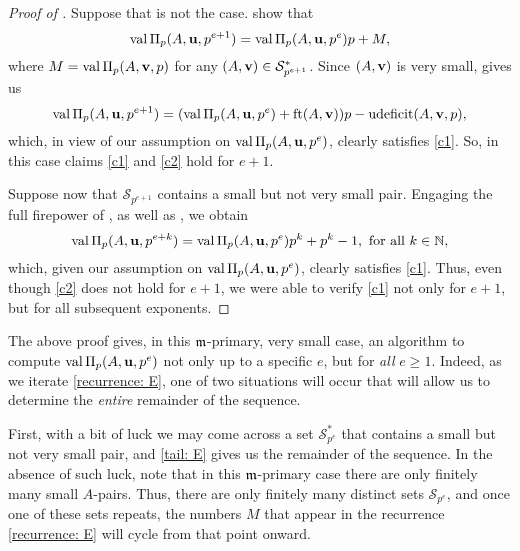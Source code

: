 \documentclass[11pt]{amsart}
\newcommand{\udeficit}{\operatorname{udeficit}}
\renewcommand{\S}{\mathcal{S}}
\begin{document}
\begin{proof}[Proof of ]
   Suppose that is not the case.
    show that
   \begin{equation}
      \label{recurrence: E}
      \operatorname{val} \Pi_p(A,\mathbf{u},p^{e+1}) = \operatorname{val} \Pi_p(A,\mathbf{u},p^e)p + M,
   \end{equation}
   where $M = \operatorname{val}\Pi_p(A,\mathbf{v},p)$ for any  $(A,\vv{v}) \in \S^*_{p^{e+1}}$.
   Since $(A,\mathbf{v})$ is very small,  gives us
   \[\val \IP_p(A,\vv{u},p^{e+1}) = (\val \IP_p(A,\vv{u},p^e) + \ft{A}{\vv{v}}) p - \udeficit(A,\vv{v},p),\]
   which, in view of our assumption on $\operatorname{val} \Pi_p(A,\mathbf{u},p^e)$, clearly satisfies \ref{c1}.
   So, in this case claims \ref{c1} and \ref{c2} hold for $e+1$.

   Suppose now that $\S_{p^{e+1}}$ contains a small but not very small pair.
   Engaging the full firepower of , as well as , we obtain
   \begin{equation}
      \label{tail: E}
      \operatorname{val} \Pi_p(A,\mathbf{u},p^{e+k}) = \operatorname{val} \Pi_p(A,\mathbf{u},p^e)p^k + p^k - 1,\text{ for all }k\in \mathbb{N},
   \end{equation}
   which, given our assumption on $\operatorname{val} \Pi_p(A,\mathbf{u},p^e)$, clearly satisfies \ref{c1}.
   Thus, even though \ref{c2} does not hold for $e+1$, we were able to verify \ref{c1} not only for $e+1$, but for all subsequent exponents.
\end{proof}

\begin{remark}[An algorithm]
   \label{m-primary algorithm: R}
   The above proof gives, in this $\mathfrak{m}$-primary, very small case, an algorithm to compute $\operatorname{val}\Pi_p(A,\mathbf{u},p^e)$ not only up to a specific $e$, but for \emph{all} $e \ge 1$.
   Indeed, as we iterate \eqref{recurrence: E}, one of two situations will occur that will allow us to determine the \emph{entire} remainder of the sequence.

   First, with a bit of luck we may come across a set $\S^*_{p^e}$ that contains a small but not very small pair, and \eqref{tail: E} gives us the remainder of the sequence.
   In the absence of such luck, note that in this $\mathfrak{m}$-primary case there are only finitely many small $A$-pairs.
   Thus, there are only finitely many distinct sets $\S_{p^e}$, and once one of these sets repeats, the numbers $M$ that appear in the recurrence \eqref{recurrence: E} will cycle from that point onward.
\end{remark}
\end{document}

